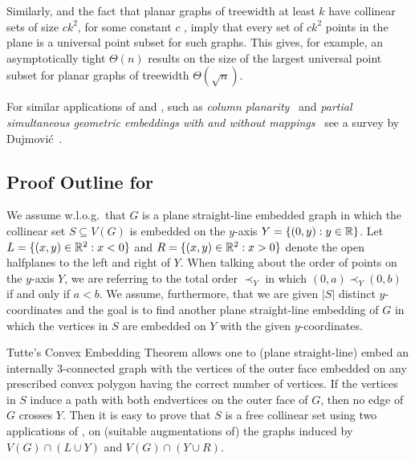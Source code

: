 Similarly,  and the fact that planar graphs of
treewidth at least $k$ have collinear sets of size $ck^2$, for some
constant $c$ \cite{dalozzo.dujmovic.ea:drawing}, imply that every set
of  $c k^2$ points in the plane is a universal point subset for  such
graphs. This gives, for example, an asymptotically tight  $\Theta(n)$
results on the size of the largest universal point subset for planar
graphs of treewidth $\Theta(\sqrt{n})$. 

For similar applications of 
and , such as \emph{column
planarity}~\cite{behks-cppsge-17,dalozzo.dujmovic.ea:drawing,dujmovic:utility}
and \emph{partial simultaneous geometric embeddings with and without
mappings}~\cite{behks-cppsge-17,ddlmw-pqp-15,dujmovic:utility} see a
survey by Dujmovi\'c~\cite{dujmovic:utility}.



\subsection{Proof Outline for }

We assume w.l.o.g.\ that $G$ is a plane straight-line
embedded graph in which the collinear set $S\subseteq V(G)$ is embedded
on the $y$-axis $Y=\{(0,y):y\in\mathbb{R}\}$. Let
$L=\{(x,y)\in\mathbb{R}^2:x<0\}$ and $R=\{(x,y)\in\mathbb{R}^2: x >0\}$ denote the open
halfplanes to the left and right of $Y$. When talking about the order of points on the $y$-axis $Y$, we are referring to the total order $\prec_Y$ in which $(0,a) \prec_Y (0,b)$ if and only if $a<b$. We assume, furthermore, that we are given $|S|$ distinct $y$-coordinates and the goal is to find another plane straight-line embedding of $G$ in which the vertices in $S$ are embedded on $Y$ with the given $y$-coordinates.

Tutte's Convex Embedding Theorem \cite{tutte:how} allows one to (plane
straight-line) embed an internally 3-connected graph with the vertices
of the outer face embedded on any prescribed convex polygon having the
correct number of vertices.  If the vertices in $S$ induce a path with
both endvertices on the outer face of $G$, then no edge of $G$ crosses
$Y$. Then it is easy to prove that $S$ is a free
collinear set using two applications of \cite{tutte:how}, on (suitable augmentations of) the graphs induced
by $V(G)\cap(L\cup Y)$ and $V(G)\cap(Y\cup R)$.

